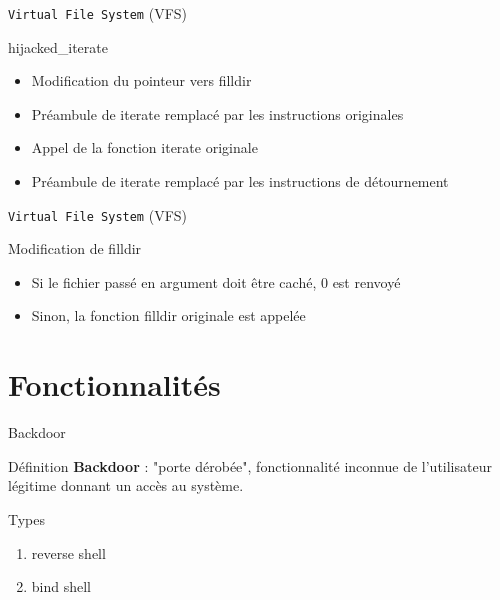 \documentclass[10pt]{beamer}
\begin{document}
	\begin{frame}{\texttt{Virtual File System} (VFS)}
		\begin{alertblock}{hijacked\_iterate}
	    \end{alertblock}	 
		\vspace{-0.60cm}
		\begin{itemize}
			\item Modification du pointeur vers \alert{filldir}
			\item Préambule de \alert{iterate} remplacé par les instructions originales
			\item Appel de la fonction \alert{iterate} originale
			\item Préambule de \alert{iterate} remplacé par les instructions de détournement
		\end{itemize}
	\end{frame}

	\begin{frame}{\texttt{Virtual File System} (VFS)}
		\begin{alertblock}{Modification de filldir}
	    \end{alertblock}	 
		\vspace{-0.60cm}
		\begin{itemize}
			\item Si le fichier passé en argument doit être caché, 0 est renvoyé
			\item Sinon, la fonction \alert{filldir} originale est appelée
		\end{itemize}
	\end{frame}

\section{Fonctionnalités}

\begin{frame}{Backdoor}
	
	\begin{alertblock}{Définition}
		\textbf{Backdoor} : "porte dérobée", fonctionnalité inconnue de l'utilisateur légitime donnant un accès au système.
    \end{alertblock}
    
	\begin{alertblock}{Types}
		\begin{enumerate}
			\item reverse shell
			\item bind shell
		\end{enumerate}
    \end{alertblock}

\end{frame}
\end{document}
